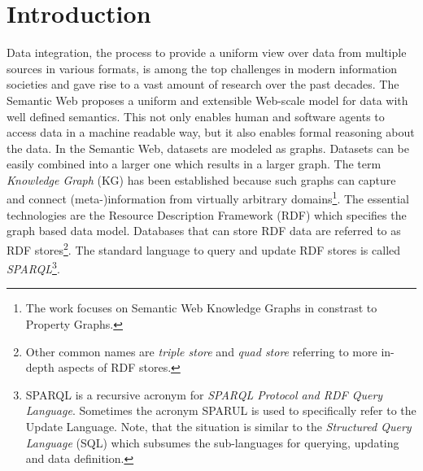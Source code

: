 
\chapter{Introduction}


Data integration, the process to provide a uniform view over data from multiple sources in various formats,
is among the top challenges in modern information societies and gave rise to a vast amount of research over the past decades.
The Semantic Web proposes a uniform and extensible Web-scale model for data with well defined semantics.
This not only enables human and software agents to access data in a machine readable way, but it also enables formal reasoning about the data.
In the Semantic Web, datasets are modeled as graphs.
Datasets can be easily combined into a larger one which results in a larger graph.
The term \textit{Knowledge Graph} (KG) has been established because such graphs can capture and connect (meta-)information
from virtually arbitrary domains\footnote{The work focuses on Semantic Web Knowledge Graphs in constrast to Property Graphs.}.
The essential technologies are the Resource Description Framework (RDF) which specifies the graph based data model.
Databases that can store RDF data are referred to as RDF stores\footnote{Other common names are \textit{triple store} and \textit{quad store} referring to more in-depth aspects of RDF stores.}.
The standard language to query and update RDF stores is called \textit{SPARQL}\footnote{SPARQL is a recursive acronym for \textit{SPARQL Protocol and RDF Query Language}. Sometimes the acronym SPARUL is used to specifically refer to the Update Language. Note, that the situation is similar to the \textit{Structured Query Language} (SQL) which subsumes the sub-languages for querying, updating and data definition.}.

